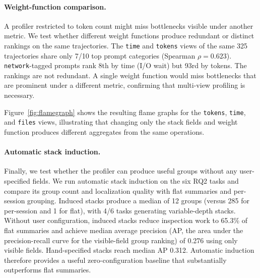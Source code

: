 \documentclass[letterpaper]{article}
\begin{document}
\paragraph{Weight-function comparison.}
A profiler restricted to token count might miss bottlenecks visible under
another metric. We test whether different weight functions produce redundant
or distinct rankings on the same trajectories.
The \texttt{time} and \texttt{tokens} views of the same 325 trajectories share only 7/10 top prompt categories (Spearman $\rho = 0.623$).
\texttt{network}-tagged prompts rank 8th by time (I/O wait) but 93rd by tokens.
The rankings are not redundant. A single weight function would miss
bottlenecks that are prominent under a different metric, confirming that
multi-view profiling is necessary.

Figure~\ref{fig:flamegraph} shows the resulting flame graphs for the
\texttt{tokens}, \texttt{time}, and \texttt{files} views, illustrating that
changing only the stack fields and weight function produces different
aggregates from the same operations.

\paragraph{Automatic stack induction.}
Finally, we test whether the profiler can produce useful groups without any user-specified fields.
We run automatic stack induction on the six RQ2 tasks and compare its group
count and localization quality with flat summaries and per-session grouping.
Induced stacks produce a median of 12 groups (versus 285 for per-session and 1 for flat), with 4/6 tasks generating variable-depth stacks.
Without user configuration, induced stacks reduce inspection work to 65.3\%
of flat summaries and achieve median average precision (AP, the area under the
precision-recall curve for the visible-field group ranking) of 0.276
using only visible fields. Hand-specified stacks reach median AP 0.312.
Automatic induction therefore provides a useful zero-configuration baseline
that substantially outperforms flat summaries.
\end{document}
